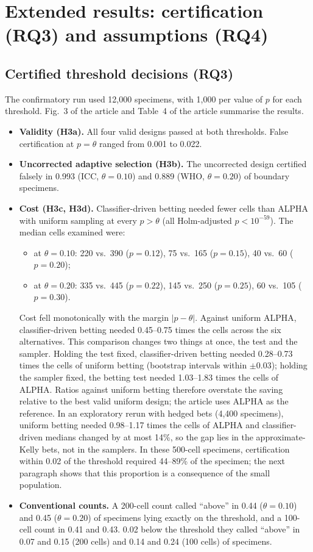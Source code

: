 \documentclass[11pt]{article}
\theoremstyle{remark}
\theoremstyle{definition}
\begin{document}
\section{Extended results: certification (RQ3) and assumptions (RQ4)}\label{s:rq34}
\subsection{Certified threshold decisions (RQ3)}\label{sec:rq3res}
The confirmatory run used 12,000 specimens, with 1,000 per value of $p$ for each threshold. Fig.~3 of the article and Table~4 of the article summarise the results.
\begin{itemize}
\item \textbf{Validity (H3a).} All four valid designs passed at both thresholds. False certification at $p=\theta$ ranged from 0.001 to 0.022.
\item \textbf{Uncorrected adaptive selection (H3b).} The uncorrected design certified falsely in 0.993 (ICC, $\theta=0.10$) and 0.889 (WHO, $\theta=0.20$) of boundary specimens.
\item \textbf{Cost (H3c, H3d).} Classifier-driven betting needed fewer cells than ALPHA with uniform sampling at every $p>\theta$ (all Holm-adjusted $p<10^{-59}$). The median cells examined were:
  \begin{itemize}
  \item at $\theta=0.10$: 220 vs.\ 390 ($p=0.12$), 75 vs.\ 165 ($p=0.15$), 40 vs.\ 60 ($p=0.20$);
  \item at $\theta=0.20$: 335 vs.\ 445 ($p=0.22$), 145 vs.\ 250 ($p=0.25$), 60 vs.\ 105 ($p=0.30$).
  \end{itemize}
  Cost fell monotonically with the margin $|p-\theta|$. Against uniform ALPHA, classifier-driven betting needed 0.45--0.75 times the cells across the six alternatives. This comparison changes two things at once, the test and the sampler. Holding the test fixed, classifier-driven betting needed 0.28--0.73 times the cells of uniform betting (bootstrap intervals within $\pm0.03$); holding the sampler fixed, the betting test needed 1.03--1.83 times the cells of ALPHA. Ratios against uniform betting therefore overstate the saving relative to the best valid uniform design; the article uses ALPHA as the reference. In an exploratory rerun with hedged bets (4,400 specimens), uniform betting needed 0.98--1.17 times the cells of ALPHA and classifier-driven medians changed by at most 14\%, so the gap lies in the approximate-Kelly bets, not in the samplers. In these 500-cell specimens, certification within 0.02 of the threshold required 44--89\% of the specimen; the next paragraph shows that this proportion is a consequence of the small population.
\item \textbf{Conventional counts.} A 200-cell count called ``above'' in 0.44 ($\theta=0.10$) and 0.45 ($\theta=0.20$) of specimens lying exactly on the threshold, and a 100-cell count in 0.41 and 0.43. 0.02 below the threshold they called ``above'' in 0.07 and 0.15 (200 cells) and 0.14 and 0.24 (100 cells) of specimens.
\end{itemize}
\end{document}
